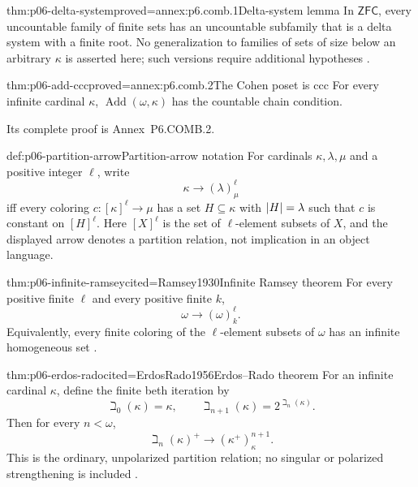 \begin{hbtheorem}{thm:p06-delta-system}{proved=annex:p6.comb.1}{Delta-system lemma}
In \(\mathsf{ZFC}\), every uncountable family of finite sets has an
uncountable subfamily that is a delta system with a finite root.  No
generalization to families of sets of size below an arbitrary \(\kappa\) is
asserted here; such versions require additional hypotheses
\cite{Shanin1946,Jech2003}.
\end{hbtheorem}

\begin{hblemma}{thm:p06-add-ccc}{proved=annex:p6.comb.2}{The Cohen poset is ccc}
For every infinite cardinal \(\kappa\),
\(\operatorname{Add}(\omega,\kappa)\) has the countable chain condition.
\end{hblemma}

Its complete proof is
Annex~P6.COMB.2.

\begin{hbdefinition}{def:p06-partition-arrow}{Partition-arrow notation}
For cardinals \(\kappa,\lambda,\mu\) and a positive integer \(\ell\), write
\[
  \kappa\longrightarrow(\lambda)^\ell_\mu
\]
iff every coloring \(c:[\kappa]^\ell\to\mu\) has a set
\(H\subseteq\kappa\) with \(\lvert H\rvert=\lambda\) such that \(c\) is constant on
\([H]^\ell\).  Here \([X]^\ell\) is the set of \(\ell\)-element subsets of \(X\),
and the displayed arrow denotes a partition relation, not implication in an
object language.
\end{hbdefinition}

\begin{hbtheorem}{thm:p06-infinite-ramsey}{cited=Ramsey1930}{Infinite Ramsey theorem}
For every positive finite \(\ell\) and every positive finite \(k\),
\[
  \omega\longrightarrow(\omega)^\ell_k.
\]
Equivalently, every finite coloring of the \(\ell\)-element subsets of
\(\omega\) has an infinite homogeneous set \cite{Ramsey1930}.
\end{hbtheorem}

\begin{hbtheorem}{thm:p06-erdos-rado}{cited=ErdosRado1956}{Erdos--Rado theorem}
For an infinite cardinal \(\kappa\), define the finite beth iteration by
\[
  \beth_0(\kappa)=\kappa,
  \qquad
  \beth_{n+1}(\kappa)=2^{\beth_n(\kappa)}.
\]
Then for every \(n<\omega\),
\[
  \beth_n(\kappa)^+
  \longrightarrow
  (\kappa^+)^{n+1}_\kappa.
\]
This is the ordinary, unpolarized partition relation; no singular or
polarized strengthening is included \cite{ErdosRado1956}.
\end{hbtheorem}


